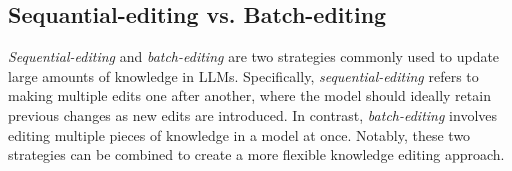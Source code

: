 








\subsection{Sequantial-editing vs. Batch-editing} \label{sec:comparison}

\textit{Sequential-editing} and \textit{batch-editing} are two strategies commonly used to update large amounts of knowledge in LLMs\cite{yao-etal-2023-editing}. Specifically, \textit{sequential-editing} refers to making multiple edits one after another, where the model should ideally retain previous changes as new edits are introduced. In contrast, \textit{batch-editing} involves editing multiple pieces of knowledge in a model at once. Notably, these two strategies can be combined to create a more flexible knowledge editing approach.

